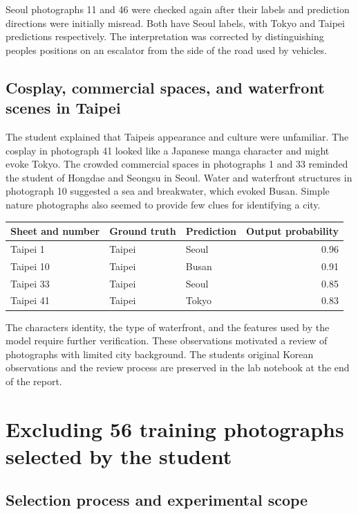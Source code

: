 \documentclass[11pt]{article}
\begin{document}
Seoul photographs 11 and 46 were checked again after their labels and
prediction directions were initially misread. Both have Seoul labels, with
Tokyo and Taipei predictions respectively. The interpretation was corrected
by distinguishing people\textquotesingle{}s positions on an escalator from the side of the
road used by vehicles.

\subsection{Cosplay, commercial spaces, and waterfront scenes in Taipei}

The student explained that Taipei\textquotesingle{}s appearance and culture were unfamiliar.
The cosplay in photograph 41 looked like a Japanese manga character and might
evoke Tokyo. The crowded commercial spaces in photographs 1 and 33 reminded
the student of Hongdae and Seongsu in Seoul. Water and waterfront structures
in photograph 10 suggested a sea and breakwater, which evoked Busan. Simple
nature photographs also seemed to provide few clues for identifying a city.

\begin{center}\small
\begin{tabular}{lllr}
\toprule
Sheet and number & Ground truth & Prediction & Output probability \\
\midrule
Taipei 1 & Taipei & Seoul & 0.96 \\
Taipei 10 & Taipei & Busan & 0.91 \\
Taipei 33 & Taipei & Seoul & 0.85 \\
Taipei 41 & Taipei & Tokyo & 0.83 \\
\bottomrule
\end{tabular}
\end{center}

The character\textquotesingle{}s identity, the type of waterfront, and the features used by
the model require further verification. These observations motivated a review
of photographs with limited city background. The student\textquotesingle{}s original Korean
observations and the review process are preserved in the lab notebook at the
end of the report.

\section{Excluding 56 training photographs selected by the student}

\subsection{Selection process and experimental scope}
\end{document}
